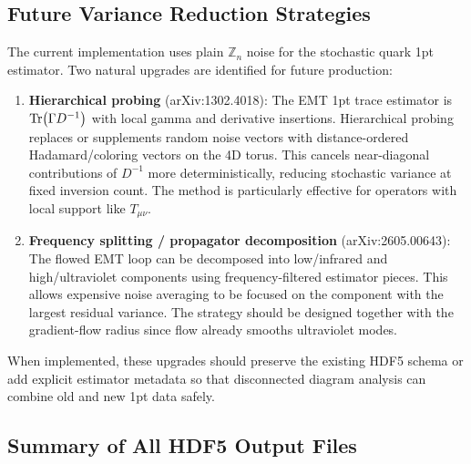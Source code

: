 \documentclass[11pt,a4paper]{article}
\newcommand{\znum}{\mathbb{Z}_n}
\begin{document}
\subsection{Future Variance Reduction Strategies}
\label{sec:variance_reduction}

The current implementation uses plain $\znum$ noise for the stochastic quark 1pt estimator. Two natural upgrades are identified for future production:

\begin{enumerate}[nosep]
  \item \textbf{Hierarchical probing} \cite{Stathopoulos:2013} (arXiv:1302.4018):
  The EMT 1pt trace estimator is $\Tr(\Gamma D^{-1})$ with local gamma and derivative insertions. Hierarchical probing replaces or supplements random noise vectors with distance-ordered Hadamard/coloring vectors on the 4D torus. This cancels near-diagonal contributions of $D^{-1}$ more deterministically, reducing stochastic variance at fixed inversion count. The method is particularly effective for operators with local support like $T_{\mu\nu}$.

  \item \textbf{Frequency splitting / propagator decomposition} (arXiv:2605.00643):
  The flowed EMT loop can be decomposed into low/infrared and high/ultraviolet components using frequency-filtered estimator pieces. This allows expensive noise averaging to be focused on the component with the largest residual variance. The strategy should be designed together with the gradient-flow radius since flow already smooths ultraviolet modes.
\end{enumerate}

When implemented, these upgrades should preserve the existing HDF5 schema or add explicit estimator metadata so that disconnected diagram analysis can combine old and new 1pt data safely.

\subsection{Summary of All HDF5 Output Files}
\label{sec:hdf5_summary}
\end{document}
